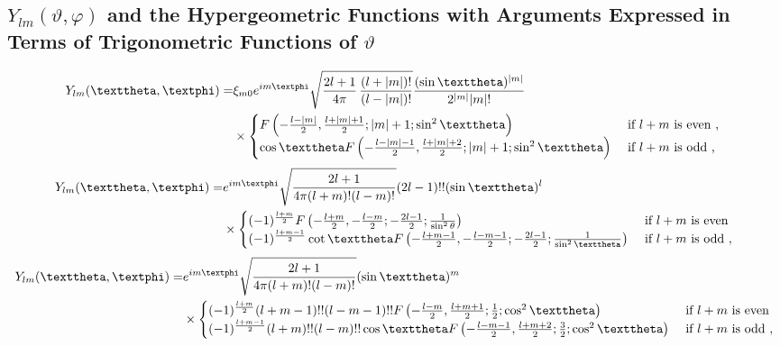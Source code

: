 \subsection{$Y_{l m}(\vartheta, \varphi)$ and the Hypergeometric Functions with Arguments Expressed in Terms of Trigonometric Functions of $\vartheta$}\label{sec:5.2.5}
\begin{fleqn}
\begin{align}
Y_{l m}(\vartheta, \varphi)=&\xi_{m 0} e^{i m \varphi} \sqrt{\frac{2 l+1}{4 \pi} \, \frac{(l+|m|)!}{(l-|m|)!}} \frac{(\sin \vartheta)^{|m|}}{2^{|m|}|m|!}  \notag\\
& \times\begin{cases}
F\left(-\frac{l-|m|}{2}, \frac{l+|m|+1}{2} ;|m|+1 ; \sin ^{2} \vartheta\right) &
\text { if } l+m \text { is even , } \\
\cos \vartheta F\left(-\frac{l-|m|-1}{2}, \frac{l+|m|+2}{2} ;|m|+1 ; \sin ^{2} \vartheta\right) &
\text { if } l+m \text { is odd , }
\end{cases}  \label{eq:5:2:29}
\end{align}
\begin{align}
 Y_{l m}(\vartheta, \varphi)=&e^{i m \varphi} \sqrt{\frac{2 l+1}{4 \pi(l+m)!(l-m)!}}(2 l-1)!!(\sin \vartheta)^{l}  \notag\\
& \times\begin{cases}
(-1)^{\frac{l+m}{2}} F\left(-\frac{l+m}{2},-\frac{l-m}{2} ;-\frac{2 l-1}{2} ; \frac{1}{\sin ^{2} \theta}\right) &
\text { if } l+m \text { is even } \\
(-1)^{\frac{l+m-1}{2}} \cot \vartheta F\left(-\frac{l+m-1}{2},-\frac{l-m-1}{2} ;-\frac{2 l-1}{2} ; \frac{1}{\sin ^{2} \vartheta}\right) &
\text { if } l+m \text { is odd },
\end{cases}  \label{eq:5:2:30}
\end{align}
\begin{align}
 Y_{l m}(\vartheta, \varphi)=&e^{i m \varphi} \sqrt{\frac{2 l+1}{4 \pi(l+m)!(l-m)!}}(\sin \vartheta)^{m}  \notag\\
& \times\begin{cases}
(-1)^{\frac{l+m}{2}}(l+m-1)!!(l-m-1)!!F\left(-\frac{l-m}{2}, \frac{l+m+1}{2} ; \frac{1}{2} ; \cos ^{2} \vartheta\right) &
\text { if } l+m \text { is even } \\
(-1)^{\frac{l+m-1}{2}}(l+m)!!(l-m)!!\cos \vartheta F\left(-\frac{l-m-1}{2}, \frac{l+m+2}{2} ; \frac{3}{2} ; \cos ^{2} \vartheta\right) &
\text { if } l+m \text { is odd },

\end{cases}
\end{align}
\end{fleqn}
